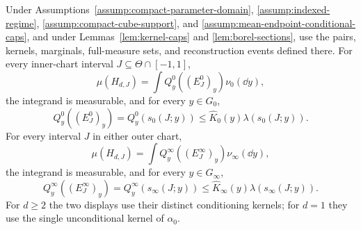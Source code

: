\begin{proposition}
\label{prop:matching-disintegration}
Under Assumptions~\ref{assump:compact-parameter-domain},
\ref{assump:indexed-regime}, \ref{assump:compact-cube-support}, and
\ref{assump:mean-endpoint-conditional-caps}, and under
Lemmas~\ref{lem:kernel-caps} and \ref{lem:borel-sections}, use the pairs,
kernels, marginals, full-measure sets, and reconstruction events defined
there.  For every inner-chart interval $J\subseteq\Theta\cap[-1,1]$,
\begin{equation}
\mu(H_{d,J})=\int Q^0_y((E^0_J)_y)\nu_0(\dd y),
\label{eq:inner-disintegration}
\end{equation}
the integrand is measurable, and for every $y\in G_0$,
\begin{equation}
Q^0_y((E^0_J)_y)=Q^0_y(s_0(J;y))
\leq\widehat K_0(y)\lambda(s_0(J;y)).
\label{eq:inner-fiber-bound}
\end{equation}
For every interval $J$ in either outer chart,
\begin{equation}
\mu(H_{d,J})=\int Q^\infty_y((E^\infty_J)_y)\nu_\infty(\dd y),
\label{eq:outer-disintegration}
\end{equation}
the integrand is measurable, and for every $y\in G_\infty$,
\begin{equation}
Q^\infty_y((E^\infty_J)_y)=Q^\infty_y(s_\infty(J;y))
\leq\widehat K_\infty(y)\lambda(s_\infty(J;y)).
\label{eq:outer-fiber-bound}
\end{equation}
For $d\geq2$ the two displays use their distinct conditioning kernels; for
$d=1$ they use the single unconditional kernel of $\alpha_0$.
\end{proposition}


